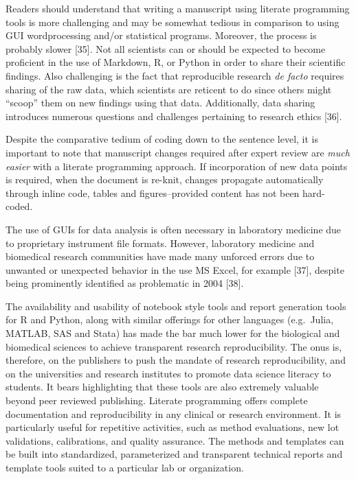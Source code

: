 \documentclass[]{elsarticle} %
\begin{document}
Readers should understand that writing a manuscript using literate
programming tools is more challenging and may be somewhat tedious in
comparison to using GUI wordprocessing and/or statistical programs.
Moreover, the process is probably slower {[}35{]}. Not all scientists
can or should be expected to become proficient in the use of Markdown,
R, or Python in order to share their scientific findings. Also
challenging is the fact that reproducible research \emph{de facto}
requires sharing of the raw data, which scientists are reticent to do
since others might ``scoop'' them on new findings using that data.
Additionally, data sharing introduces numerous questions and challenges
pertaining to research ethics {[}36{]}.

Despite the comparative tedium of coding down to the sentence level, it
is important to note that manuscript changes required after expert
review are \emph{much easier} with a literate programming approach. If
incorporation of new data points is required, when the document is
re-knit, changes propagate automatically through inline code, tables and
figures--provided content has not been hard-coded.

The use of GUIs for data analysis is often necessary in laboratory
medicine due to proprietary instrument file formats. However, laboratory
medicine and biomedical research communities have made many unforced
errors due to unwanted or unexpected behavior in the use MS Excel, for
example {[}37{]}, despite being prominently identified as problematic in
2004 {[}38{]}.

The availability and usability of notebook style tools and report
generation tools for R and Python, along with similar offerings for
other languages (e.g.~Julia, MATLAB, SAS and Stata) has made the bar
much lower for the biological and biomedical sciences to achieve
transparent research reproducibility. The onus is, therefore, on the
publishers to push the mandate of research reproducibility, and on the
universities and research institutes to promote data science literacy to
students. It bears highlighting that these tools are also extremely
valuable beyond peer reviewed publishing. Literate programming offers
complete documentation and reproducibility in any clinical or research
environment. It is particularly useful for repetitive activities, such
as method evaluations, new lot validations, calibrations, and quality
assurance. The methods and templates can be built into standardized,
parameterized and transparent technical reports and template tools
suited to a particular lab or organization.
\end{document}
